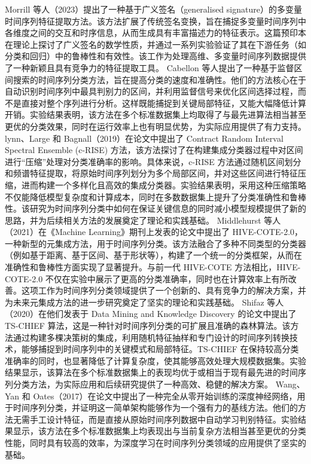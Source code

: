 Morrill 等人（2023）提出了一种基于广义签名（generalised signature）的多变量时间序列特征提取方法。该方法扩展了传统签名变换，旨在捕捉多变量时间序列中各维度之间的交互和时序信息，从而生成具有丰富描述力的特征表示。这篇预印本在理论上探讨了广义签名的数学性质，并通过一系列实验验证了其在下游任务（如分类和回归）中的鲁棒性和有效性。该工作为处理高维、多变量时间序列数据提供了一种新颖且具有竞争力的特征提取工具。
Cabellon 等人提出了一种基于监督区间搜索的时间序列分类方法，旨在提高分类的速度和准确性。他们的方法核心在于自动识别时间序列中最具判别力的区间，并利用监督信号来优化区间选择过程，而不是直接对整个序列进行分析。这样既能捕捉到关键局部特征，又能大幅降低计算开销。实验结果表明，该方法在多个标准数据集上均取得了与最先进算法相当甚至更优的分类效果，同时在运行效率上也有明显优势，为实际应用提供了有力支持。
lynn、Large 和 Bagnall（2019）在论文中提出了 Contract Random Interval Spectral Ensemble (c-RISE) 方法，该方法探讨了在构建集成分类器过程中对区间进行“压缩”处理对分类准确率的影响。具体来说，c-RISE 方法通过随机区间划分和频谱特征提取，将原始时间序列划分为多个局部区间，并对这些区间进行特征压缩，进而构建一个多样化且高效的集成分类器。实验结果表明，采用这种压缩策略不仅能降低模型复杂度和计算成本，同时在多数数据集上提升了分类准确性和鲁棒性。该研究为时间序列分类中如何在保证关键信息的同时减小模型规模提供了新的思路，并为后续相关方法的发展奠定了理论和实践基础。
Middlehurst 等人（2021）在《Machine Learning》期刊上发表的论文中提出了 HIVE-COTE-2.0，一种新型的元集成方法，用于时间序列分类。该方法融合了多种不同类型的分类器（例如基于距离、基于区间、基于形状等），构建了一个统一的分类框架，从而在准确性和鲁棒性方面实现了显著提升。与前一代 HIVE-COTE 方法相比，HIVE-COTE-2.0 不仅在实验中展示了更高的分类准确率，同时也在计算效率上有所改善。这项工作为时间序列分类领域提供了一个创新的、具有竞争力的解决方案，并为未来元集成方法的进一步研究奠定了坚实的理论和实践基础。
Shifaz 等人（2020）在他们发表于 Data Mining and Knowledge Discovery 的论文中提出了 TS-CHIEF 算法，这是一种针对时间序列分类的可扩展且准确的森林算法。该方法通过构建多棵决策树的集成，利用随机特征抽样和专门设计的时间序列转换技术，能够捕捉到时间序列中的关键模式和局部特征。TS-CHIEF 在保持较高分类准确率的同时，也显著降低了计算复杂度，使其能够高效处理大规模数据集。实验结果显示，该算法在多个标准数据集上的表现均优于或相当于现有最先进的时间序列分类方法，为实际应用和后续研究提供了一种高效、稳健的解决方案。
Wang、Yan 和 Oates（2017）在论文中提出了一种完全从零开始训练的深度神经网络，用于时间序列分类，并证明这一简单架构能够作为一个强有力的基线方法。他们的方法无需手工设计特征，而是直接从原始时间序列数据中自动学习判别特征。实验结果显示，该方法在多个标准数据集上均表现出与当前复杂方法相当甚至更优的分类性能，同时具有较高的效率，为深度学习在时间序列分类领域的应用提供了坚实的基础。
